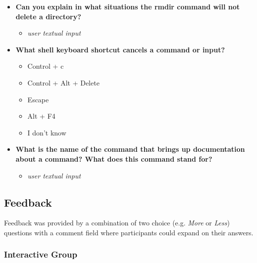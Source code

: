 \begin{itemize}
	\item  \textbf{Can you explain in what situations the rmdir command will not delete a directory?}
	      \begin{itemize}
		      \item \textit{user textual input}
	      \end{itemize}
	\item  \textbf{What shell keyboard shortcut cancels a command or input?}
	      \begin{itemize}
		      \item Control + c
		      \item Control + Alt + Delete
		      \item Escape
		      \item Alt + F4
		      \item I don't know
	      \end{itemize}
	\item  \textbf{What is the name of the command that brings up documentation about a command? What does this command stand for?}
	      \begin{itemize}
		      \item \textit{user textual input}
	      \end{itemize}
\end{itemize}

\subsection{Feedback}
Feedback was provided by a combination of two choice (e.g. \textit{More} or \textit{Less}) questions with a comment
field where participants could expand on their answers.
\subsubsection{Interactive Group}

